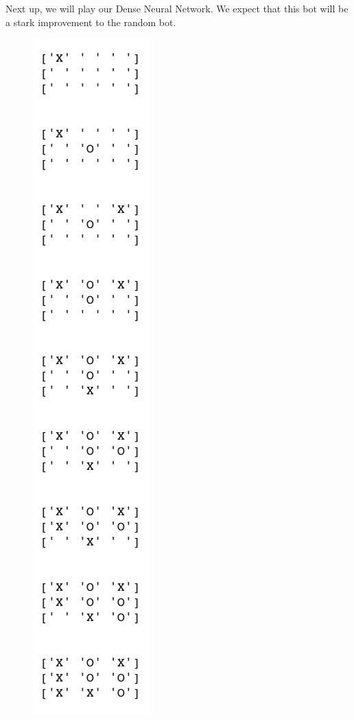 Next up, we will play our Dense Neural Network. We expect that this bot will be a stark improvement to the random bot. 

\begin{figure}[H]
	\centering
	\includegraphics[scale=.5]{h_v_dense}
\end{figure}

